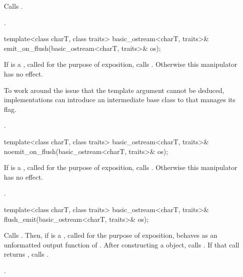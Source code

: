 \begin{itemdescr}
\pnum
\effects
Calls
.

\pnum
\returns
{}.
\end{itemdescr}

%
\begin{itemdecl}
template<class charT, class traits>
  basic_ostream<charT, traits>& emit_on_flush(basic_ostream<charT, traits>& os);
\end{itemdecl}

\begin{itemdescr}
\pnum
\effects
If  is a
,
called  for the purpose of exposition,
calls .
Otherwise this manipulator has no effect.
\begin{note}
To work around the issue that the
 template argument cannot be deduced,
implementations can introduce an intermediate base class
to  that manages its  flag.
\end{note}

\pnum
\returns
{}.
\end{itemdescr}

%
\begin{itemdecl}
template<class charT, class traits>
  basic_ostream<charT, traits>& noemit_on_flush(basic_ostream<charT, traits>& os);
\end{itemdecl}

\begin{itemdescr}
\pnum
\effects
If  is a
,
called  for the purpose of exposition,
calls .
Otherwise this manipulator has no effect.

\pnum
\returns
{}.
\end{itemdescr}

%
\begin{itemdecl}
template<class charT, class traits>
  basic_ostream<charT, traits>& flush_emit(basic_ostream<charT, traits>& os);
\end{itemdecl}

\begin{itemdescr}
\pnum
\effects
Calls .
Then, if  is a
,
called  for the purpose of exposition,
behaves as an unformatted output function
of .
After constructing a  object, calls .
If that call returns , calls .

\pnum
\returns
{}.
\end{itemdescr}

